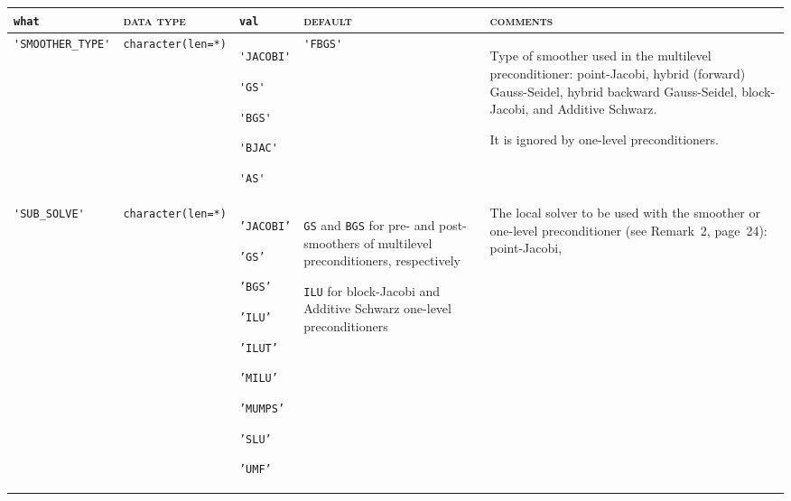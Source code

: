 \bsideways
\begin{center}
\small
\begin{tabular}{|p{3.6cm}|l|p{1.9cm}|p{3.6cm}|p{6.5cm}|}
\hline
\verb|what|              & \textsc{data type}        &  \verb|val|      &  \textsc{default}  &
\textsc{comments} \\ \hline
\verb|'SMOOTHER_TYPE'|  & \verb|character(len=*)|
                         & \verb|'JACOBI'| \par \verb|'GS'| \par \verb|'BGS'| \par \verb|'BJAC'|
                            \par \verb|'AS'|
                         & \verb|'FBGS'|
                         & Type of smoother used in the multilevel preconditioner:
                            point-Jacobi, hybrid (forward) Gauss-Seidel,
                            hybrid backward Gauss-Seidel, block-Jacobi, and
                            Additive Schwarz. \par
                            It is ignored by one-level preconditioners. \\ \hline
\verb|'SUB_SOLVE'|  & \verb|character(len=*)|
                         & \texttt{'JACOBI'} \par
                           \texttt{'GS'} \par \texttt{'BGS'} \par \texttt{'ILU'} \par 
                           \texttt{'ILUT'} \par \texttt{'MILU'} \par 
                           \par \texttt{'MUMPS'} \par \texttt{'SLU'} \par \texttt{'UMF'}
                         & \texttt{GS} and \texttt{BGS} for pre- and post-smoothers
                            of multilevel preconditioners, respectively \par
                            \texttt{ILU} for block-Jacobi and Additive Schwarz
                            one-level preconditioners
                         & The local solver to be used with the smoother or one-level
                            preconditioner (see Remark~2, page~24): point-Jacobi,

\end{tabular}
\end{center}
